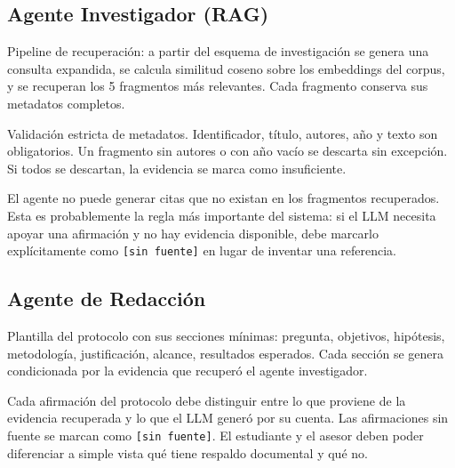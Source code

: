 \documentclass[12pt, a4paper]{article}
\begin{document}
\subsection{Agente Investigador (RAG)}

\begin{description}[style=nextline, leftmargin=3cm]
    \item[\texttt{investigador/retrieval}]
    Pipeline de recuperación: a partir del esquema de investigación se
    genera una consulta expandida, se calcula similitud coseno sobre los
    embeddings del corpus, y se recuperan los 5 fragmentos más relevantes.
    Cada fragmento conserva sus metadatos completos.

    \item[\texttt{investigador/metadatos}]
    Validación estricta de metadatos. Identificador, título, autores,
    año y texto son obligatorios. Un fragmento sin autores o con año
    vacío se descarta sin excepción. Si todos se descartan, la evidencia
    se marca como insuficiente.

    \item[\texttt{investigador/citas}]
    El agente no puede generar citas que no existan en los fragmentos
    recuperados. Esta es probablemente la regla más importante del
    sistema: si el LLM necesita apoyar una afirmación y no hay evidencia
    disponible, debe marcarlo explícitamente como \texttt{[sin fuente]}
    en lugar de inventar una referencia.
\end{description}

\subsection{Agente de Redacción}

\begin{description}[style=nextline, leftmargin=3cm]
    \item[\texttt{redaccion/protocolo}]
    Plantilla del protocolo con sus secciones mínimas: pregunta,
    objetivos, hipótesis, metodología, justificación, alcance,
    resultados esperados. Cada sección se genera condicionada por la
    evidencia que recuperó el agente investigador.

    \item[\texttt{redaccion/separacion-evidencia}]
    Cada afirmación del protocolo debe distinguir entre lo que proviene
    de la evidencia recuperada y lo que el LLM generó por su cuenta. Las
    afirmaciones sin fuente se marcan como \texttt{[sin fuente]}. El
    estudiante y el asesor deben poder diferenciar a simple vista qué
    tiene respaldo documental y qué no.
\end{description}
\end{document}
